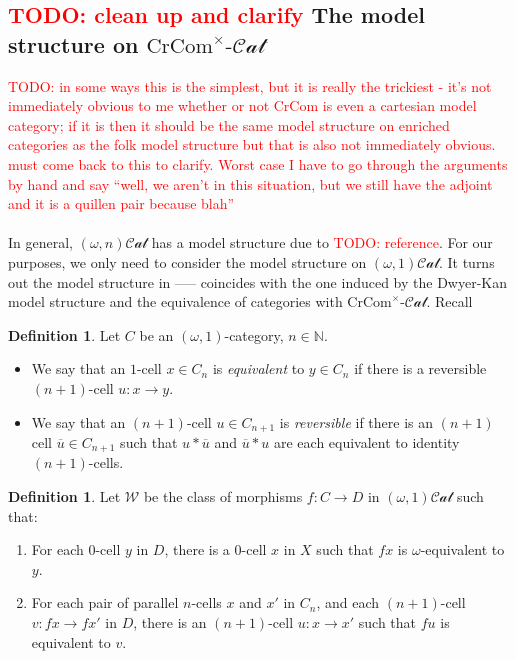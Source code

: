 \documentclass[12pt]{article}
\theoremstyle{definition}
\newtheorem{definition}[theorem]{Definition}
\newcommand{\TODO}[1]{\textcolor{red}{TODO: {#1}}}
\newcommand{\crcom}{\text{CrCom}}
\newcommand{\omegancat}[1]{(\omega,#1)\mathcal{Cat}}
\newcommand{\cartcrossedcat}{\crcom^\times\text{-}\mathcal{Cat}}
\begin{document}
\subsection{\TODO{clean up and clarify} The model structure on $\cartcrossedcat$}
	\TODO{in some ways this is the simplest, but it is really the trickiest - it's not immediately obvious to me whether or not $\crcom$ is even a cartesian model category; if it is then it should be the same model structure on enriched categories as the folk model structure but that is also not immediately obvious. must come back to this to clarify. Worst case I have to go through the arguments by hand and say ``well, we aren't in this situation, but we still have the adjoint and it is a quillen pair because blah''}
	\\\\
	In general, $\omegancat{n}$ has a model structure due to \TODO{reference}. For our purposes, we only need to consider the model structure on $\omegancat{1}$. It turns out the model structure in  ----- coincides with the one induced by the Dwyer-Kan model structure and the equivalence of categories with $\cartcrossedcat$. Recall
	\begin{definition}
	Let $C$ be an $(\omega,1)$-category, $n \in \mathbb{N}$.
		\begin{itemize}
			\item We say that an $1$-cell $x \in C_n$ is \emph{equivalent} to $y \in C_n$ if there is a reversible $(n+1)$-cell $u: x \to y$.
			\item We say that an $(n+1)$-cell $u \in C_{n+1}$ is \emph{reversible} if there is an $(n+1)$ cell $\overline{u} \in C_{n+1}$ such that $u * \overline{u}$ and $\overline{u} * u$ are each equivalent to identity $(n+1)$-cells.
		\end{itemize}
	\end{definition}
	\begin{definition}
		Let $\mathcal{W}$ be the class of morphisms $f: C \to D$ in $\omegancat{1}$ such that:
		\begin{enumerate}
			\item For each $0$-cell $y$ in $D$, there is a $0$-cell $x$ in $X$ such that $fx$ is $\omega$-equivalent to $y$.
			\item For each pair of parallel $n$-cells $x$ and $x'$ in $C_n$, and each $(n+1)$-cell $v:fx \to fx'$ in $D$, there is an $(n+1)$-cell $u:x \to x'$ such that $f u$ is equivalent to $v$.
		\end{enumerate}
	\end{definition}
\end{document}
